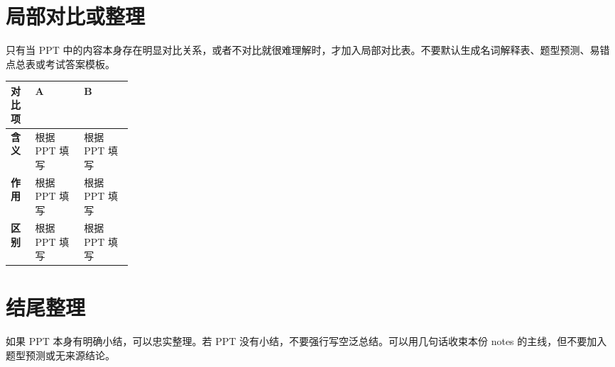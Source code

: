 \documentclass[UTF8,zihao=-4]{ctexart}
\begin{document}
\section{局部对比或整理}

只有当 PPT 中的内容本身存在明显对比关系，或者不对比就很难理解时，才加入局部对比表。不要默认生成名词解释表、题型预测、易错点总表或考试答案模板。

\begin{notebox}[局部对比]
\begin{tabularx}{\linewidth}{>{\bfseries}p{0.20\linewidth}X X}
\toprule
对比项 & A & B \\
\midrule
含义 & 根据 PPT 填写 & 根据 PPT 填写 \\
作用 & 根据 PPT 填写 & 根据 PPT 填写 \\
区别 & 根据 PPT 填写 & 根据 PPT 填写 \\
\bottomrule
\end{tabularx}
\end{notebox}

\section{结尾整理}

如果 PPT 本身有明确小结，可以忠实整理。若 PPT 没有小结，不要强行写空泛总结。可以用几句话收束本份 notes 的主线，但不要加入题型预测或无来源结论。
\end{document}
